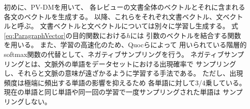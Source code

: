 
初めに、PV-DMを用いて、
各レビューの文書全体のベクトルとそれに含まれる各文のベクトルを生成する。
以降、これらをそれぞれ文書ベクトル、文ベクトルと呼ぶ。
文書ベクトルと文ベクトルについては別々に学習し生成する。
式\ref{eq:ParagraphVector}の目的関数における$h$には
引数のベクトルを結合する関数を用いる。
また、学習の高速化のため、Quocら\cite{quoc14}によって
用いられている階層的softmax関数の代替として、ネガティブサンプリングを行う。
ネガティブサンプリングとは、文脈外の単語をデータセットにおける出現確率で
サンプリングし、それらと文脈の意味が遠ざかるように学習する手法である。
ただし、出現頻度は極端に頻出する単語の影響を抑えるため
各単語に対して3/4乗している。
現在の単語と同じ単語や同一回の学習で一度サンプリングされた単語は
サンプリングしない。

